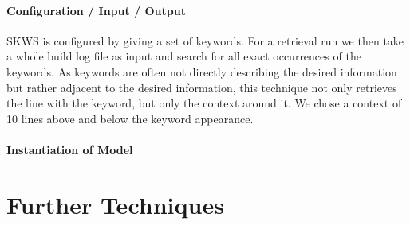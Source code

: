 \documentclass[\myrootdir/main.tex]{subfiles}
\begin{document}
\paragraph{Configuration / Input / Output}
SKWS is configured by giving a set of keywords.
For a retrieval run we then take a whole build log file as input and search for all exact occurrences of the keywords.
As keywords are often not directly describing the desired information but rather adjacent to the desired information, this technique not only retrieves the line with the keyword, but only the context around it.
We chose a context of 10 lines above and below the keyword appearance.

\paragraph{Instantiation of Model}


\section{Further Techniques}
\end{document}
